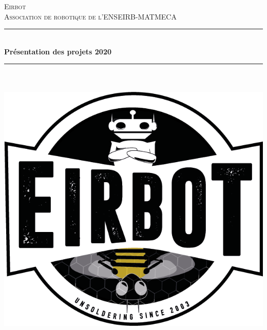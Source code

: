 \documentclass[a4paper,10pt]{article}
\newcommand{\HRule}{\rule{\linewidth}{0.1mm}}
\begin{document}
\begin{spacing}{1.5}
\graphicspath{{image/}}
  \begin{titlepage}
\begin{sffamily}
\begin{center}
\textsc{\LARGE Eirbot \\ Association de robotique de l'ENSEIRB-MATMECA}\\[2cm]
\HRule \\[0.4cm]
{\huge \bfseries Présentation des projets 2020 \\[0.4cm]}

\HRule \\[2cm]

\textsc{\Large }\\[2cm]
              \includegraphics[scale=0.3]{LogoEirbot.png} \vfill
{}
  \end{center}
  \end{sffamily}
\end{titlepage}
\setcounter{tocdepth}{2}
\newpage
\pagestyle{fancy}
\lhead{}
\rhead{\thepage}
\lfoot{}
\cfoot{}
\fancyfoot[R] {
}
\end{spacing}
\end{document}
